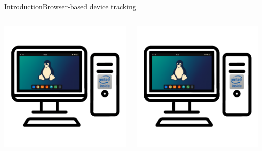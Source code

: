 \documentclass[aspectratio=169, hyperref={colorlinks=true, allcolors=SecondaryColor}, c]{beamer}
\begin{document}
\begin{frame}[fragile]{Introduction}{Browser-based device tracking}
\begin{columns}
\begin{column}{0.33\textwidth}
			\includegraphics[width=1\textwidth]{./figures/computer_alpha_screen_2_golden.png}
		\end{column}
		\begin{column}{0.33\textwidth}
			\includegraphics[width=1\textwidth]{./figures/computer_alpha_screen_2_golden.png}

\end{column}
\end{columns}
\end{frame}
\end{document}
